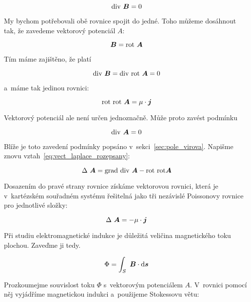 \begin{equation}
\mathrm{div} \ \boldsymbol{B} = 0
\end{equation}

My bychom potřebovali obě rovnice spojit do jedné. Toho můžeme dosáhnout tak, že zavedeme vektorový potenciál \(A\):

\begin{equation}
\boldsymbol{B} = \mathrm{rot} \ \boldsymbol{A}
\end{equation}

Tím máme zajištěno, že platí

\begin{equation}
\diverg \ \vect{B} = \diverg \ \rot \ \vect{A} = 0
\end{equation}

a~máme tak jedinou rovnici:

\begin{equation}
\mathrm{rot} \ \mathrm{rot} \ \boldsymbol{A} = \mu \cdot \boldsymbol{j}
\end{equation}

Vektorový potenciál ale není určen jednoznačně. Může proto zavést podmínku 

\begin{equation}
\mathrm{div} \ \boldsymbol{A} = 0
\end{equation}

Blíže je toto zavedení podmínky popsáno v~sekci~\ref{sec:pole_virova}. Napišme znovu vztah~\eqref{eq:vect_laplace_rozepsany}:

\begin{equation}
\Delta \ \vect{A} = \grad \ \diverg \ \vect{A} - \rot \ \rot \vect{A} 
\end{equation}

Dosazením do pravé strany rovnice získáme vektorovou rovnici, která je v~kartézském souřadném systému řešitelná jako tři nezávislé Poissonovy rovnice pro jednotlivé složky:

\begin{equation}
\Delta \ \boldsymbol{A} = -\mu \cdot \boldsymbol{j}
\end{equation}

Při studiu elektromagnetické indukce je důležitá veličina magnetického toku plochou. Zaveďme ji tedy.

\begin{equation}
\Phi = \int_S \ \boldsymbol{B} \cdot \mathrm{d}\boldsymbol{s}
\end{equation}

Prozkoumejme souvislost toku \(\Phi\) s~vektorovým potenciálem \(A\). V~rovnici pomocí něj vyjádříme magnetickou indukci a~použijeme Stokessovu větu:

